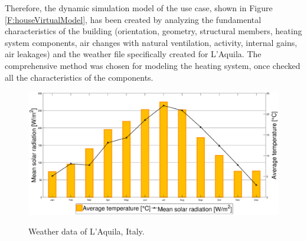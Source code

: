 Therefore, the dynamic simulation model of the use case, shown in Figure \ref{F:houseVirtualModel}, has been created by analyzing the fundamental characteristics of the building (orientation, geometry, structural members, heating system components, air changes with natural ventilation, activity, internal gains, air leakages) and the weather file specifically created for L'Aquila. The comprehensive method was chosen for modeling the heating system, once checked all the characteristics of the components.
\begin{figure}[t!]
	\begin{center}
		\hspace{-0.7cm}
		\includegraphics[width=28pc]{figures/dati_climatici_rev01.eps}
		\vspace{-0.5cm}
		\caption{Weather data of L'Aquila, Italy.}
		\captionsetup{justification=centering}
		\label{F:houseExternalWeather}
	\end{center}
\end{figure}
